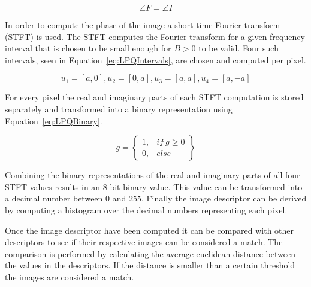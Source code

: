 \begin{equation}
  \angle F = \angle I
\label{eq:PSFFTFinal}
\end{equation}

In order to compute the phase of the image a short-time Fourier transform (STFT) is used. The STFT computes the Fourier transform for a given frequency interval that is chosen to be small enough for \(B > 0\) to be valid. Four such intervals, seen in Equation~\ref{eq:LPQIntervals}, are chosen and computed per pixel.

\begin{equation}
  u_{1} = \left [ a, 0 \right ], u_{2} = \left [ 0, a \right ], u_{3} = \left [ a, a \right ], u_{4} = \left [ a, -a \right ]
\label{eq:LPQIntervals}
\end{equation}

For every pixel the real and imaginary parts of each STFT computation is stored separately and transformed into a binary representation using Equation~\ref{eq:LPQBinary}.

\begin{equation}
  g = \begin{Bmatrix}
   1, & if\ g \geq 0\\
   0, & else
  \end{Bmatrix}
\label{eq:LPQBinary}
\end{equation}

Combining the binary representations of the real and imaginary parts of all four STFT values results in an 8-bit binary value. This value can be transformed into a decimal number between \(0\) and \(255\). Finally the image descriptor can be derived by computing a histogram over the decimal numbers representing each pixel.

Once the image descriptor have been computed it can be compared with other descriptors to see if their respective images can be considered a match. The comparison is performed by calculating the average euclidean distance between the values in the descriptors. If the distance is smaller than a certain threshold the images are considered a match.
